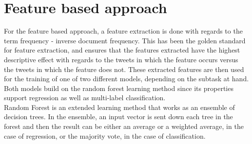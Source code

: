 
\section{Feature based approach}\label{sec:feature}

For the feature based approach, a feature extraction is done with regards to the term frequency - inverse document frequency. This has been the golden standard for feature extraction, and ensures that the features extracted have the highest descriptive effect with regards to the tweets in which the feature occurs versus the tweets in which the feature does not. These extracted features are then used for the training of one of two different models, depending on the subtask at hand.\\
Both models build on the random forest learning method since its properties support regression as well as multi-label classification. \\
Random Forest is an extended learning method that works as an ensemble of decision trees. In the ensemble, an input vector is sent down each tree in the forest and then the result can be either an average or a weighted average, in the case of regression, or the majority vote, in the case of classification.\\

